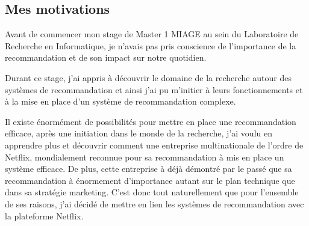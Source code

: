 \begin{center}
\subsection*{Mes motivations}
\end{center}

\hskip7mm

\begin{spacing}{1.3}

Avant de commencer mon stage de Master 1 MIAGE au sein du Laboratoire de Recherche en Informatique, je n’avais pas pris conscience de l’importance de la recommandation et de son impact sur notre quotidien. 

\vspace{5mm}

Durant ce stage, j’ai appris à découvrir le domaine de la recherche autour des systèmes de recommandation et ainsi j’ai pu m’initier à leurs fonctionnements et à la mise en place d’un système de recommandation complexe. 

\vspace{5mm}

Il existe énormément de possibilités pour mettre en place une recommandation efficace, après une initiation dans le monde de la recherche, j’ai voulu en apprendre plus et découvrir comment une entreprise multinationale de l'ordre de Netflix, mondialement reconnue pour sa recommandation à mis en place un système efficace. De plus, cette entreprise à déjà démontré par le passé que sa recommandation à énormement d’importance autant sur le plan technique que dans sa stratégie marketing. C'est donc tout naturellement que pour l'ensemble de ses raisons, j'ai décidé de mettre en lien les systèmes de recommandation avec la plateforme Netflix.

\end{spacing}